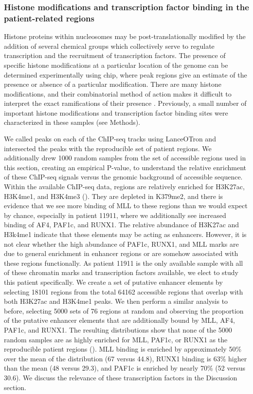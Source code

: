 \subsubsection{Histone modifications and transcription factor binding in the patient-related regions}

Histone proteins within nucleosomes may be post-translationally modified by the addition of several chemical groups which collectively serve to regulate transcription and the recruitment of transcription factors. The presence of specific histone modifications at a particular location of the genome can be determined experimentally using \gls{chip}, where peak regions give an estimate of the presence or absence of a particular modification. There are many histone modifications, and their combinatorial method of action makes it difficult to interpret the exact ramifications of their presence \cite{T2001}. Previously, a small number of important histone modifications and transcription factor binding sites were characterized in these samples (see Methods).  

We called peaks on each of the ChIP-seq tracks using LanceOTron and intersected the peaks with the reproducible set of patient regions. We additionally drew 1000 random samples from the set of accessible regions used in this section, creating an empirical P-value, to understand the relative enrichment of these ChIP-seq signals versus the genomic background of accessible sequence. Within the available ChIP-seq data, regions are relatively enriched for H3K27ac, H3K4me1, and H3K4me3 (). They are depleted in K379me2, and there is evidence that we see more binding of MLL to these regions than we would expect by chance, especially in patient 11911, where we additionally see increased binding of AF4, PAF1c, and RUNX1. The relative abundance of H3K27ac and H3k4me1 indicate that these elements may be acting as enhancers. However, it is not clear whether the high abundance of PAF1c, RUNX1, and MLL marks are due to general enrichment in enhancer regions or are somehow associated with these regions functionally. As patient 11911 is the only available sample with all of these chromatin marks and transcription factors available, we elect to study this patient specifically. We create a set of putative enhancer elements by selecting 18101 regions from the total 64162 accessible regions that overlap with both H3K27ac and H3K4me1 peaks. We then perform a similar analysis to before, selecting 5000 sets of 76 regions at random and observing the proportion of the putative enhancer elements that are additionally bound by MLL, AF4, PAF1c, and RUNX1. The resulting distributions show that none of the 5000 random samples are as highly enriched for MLL, PAF1c, or RUNX1 as the reproducible patient regions (). MLL binding is enriched by approximately 50\% over the mean of the distribution (67 versus 44.8), RUNX1 binding is 63\% higher than the mean (48 versus 29.3), and PAF1c is enriched by nearly 70\% (52 versus 30.6). We discuss the relevance of these transcription factors in the Discussion section. 

